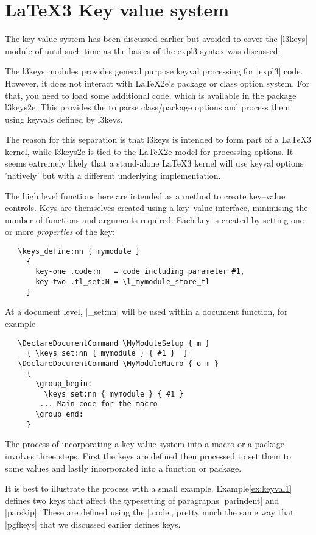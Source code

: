 \chapter{LaTeX3 Key value system}
\label{l3:keys}
The key-value system has been discussed earlier but avoided to cover the |l3keys| module of  until such time as the basics of the expl3 syntax was discussed. 


The l3keys modules provides general purpose keyval processing for |expl3| code. However, it does not interact with LaTeX2e's package or class option system. For that, you need to load some additional code, which is available in the package l3keys2e. This provides the  to parse class/package options and process them using keyvals defined by l3keys.

The reason for this separation is that l3keys is intended to form part of a LaTeX3 kernel, while l3keys2e is tied to the LaTeX2e model for processing options. It seems extremely likely that a stand-alone LaTeX3 kernel will use keyval options 'natively' but with a different underlying implementation.

 The high level functions here are intended as a method to create
 key--value controls. Keys are themselves created using a key--value
 interface, minimising the number of functions and arguments
 required. Each key is created by setting one or more \emph{properties}
 of the key:
 \begin{verbatim}
   \keys_define:nn { mymodule }
     {
       key-one .code:n   = code including parameter #1,
       key-two .tl_set:N = \l_mymodule_store_tl
     }
 \end{verbatim}
 
  At a document level, |\keys_set:nn| will be used within a
 document function, for example
 \begin{verbatim}
   \DeclareDocumentCommand \MyModuleSetup { m }
     { \keys_set:nn { mymodule } { #1 }  }
   \DeclareDocumentCommand \MyModuleMacro { o m }
     {
       \group_begin:
         \keys_set:nn { mymodule } { #1 }
        ... Main code for the macro
       \group_end:
     }
 \end{verbatim}
 
 The process of incorporating a key value system into a macro or a package involves three steps. First the keys are defined then processed to set them to some values and lastly incorporated into a function or package.
 
 It is best to illustrate the process with a small example. Example\ref{ex:keyval1} defines two keys that affect the typesetting of paragraphs |parindent| and |parskip|. These are defined using the |.code|, pretty much the same way that |pgfkeys| that we discussed earlier defines keys. 
 
